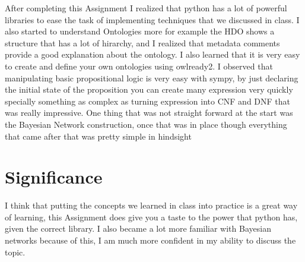 \documentclass[acmart]{acmart}
\begin{document}
After completing this Assignment I realized that python has a lot of powerful libraries to ease the task of implementing techniques that we discussed in class. I also started to understand Ontologies more for example the HDO shows a structure that has a lot of hirarchy, and I realized that metadata comments provide a good explanation about the ontology. I also learned that it is very easy to create and define your own ontologies using owlready2. I observed that manipulating basic propositional logic is very easy with sympy, by just declaring the initial state of the proposition you can create many expression very quickly specially something as complex as turning expression into CNF and DNF that was really impressive. One thing that was not straight forward at the start was the Bayesian Network construction, once that was in place though everything that came after that was pretty simple in hindsight 


\section{Significance}

I think that putting the concepts we learned in class into practice is a great way of learning, this Assignment does give you a taste to the power that python has, given the correct library. I also became a lot more familiar with Bayesian networks because of this, I am much more confident in my ability to discuss the topic. 
\end{document}
